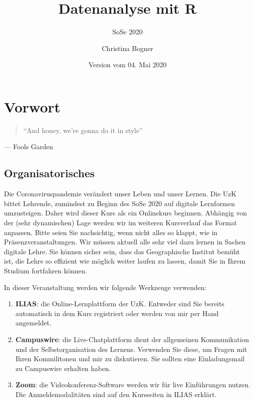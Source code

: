 \documentclass[]{book}
\title{Datenanalyse mit R}
\subtitle{SoSe 2020}
\author{Christina Bogner}
\date{Version vom 04. Mai 2020}
\providecommand{\tightlist}{%
  \setlength{\itemsep}{0pt}\setlength{\parskip}{0pt}}
\newenvironment{rmdinfo}{
  \definecolor{info}{rgb}{0.94, 0.97, 1.0}  %
  \color{black}
  \begin{mdframed}[backgroundcolor = info]}
 {\end{mdframed}}
\begin{document}
\maketitle

{
\setcounter{tocdepth}{1}
\tableofcontents
}
\hypertarget{vorwort}{%
\chapter{Vorwort}\label{vorwort}}

\begin{quote}
``And honey, we're gonna do it in style''
\end{quote}

\hfill --- Fools Garden

\hypertarget{organisatorisches}{%
\section{Organisatorisches}\label{organisatorisches}}

\begin{rmdinfo}
Die Coronaviruspandemie verändert unser Leben und unser Lernen. Die UzK
bittet Lehrende, zumindest zu Beginn des SoSe 2020 auf digitale
Lernformen umzusteigen. Daher wird dieser Kurs als ein Onlinekurs
beginnen. Abhängig von der (sehr dynamischen) Lage werden wir im
weiteren Kursverlauf das Format anpassen. Bitte seien Sie nachsichtig,
wenn nicht alles so klappt, wie in Präsenzveranstaltungen. Wir müssen
aktuell alle sehr viel dazu lernen in Sachen digitale Lehre. Sie können
sicher sein, dass das Geographische Institut bemüht ist, die Lehre so
effizient wie möglich weiter laufen zu lassen, damit Sie in Ihrem
Studium fortfahren können.
\end{rmdinfo}

In dieser Veranstaltung werden wir folgende Werkzeuge verwenden:

\begin{enumerate}
\def\labelenumi{\arabic{enumi}.}
\tightlist
\item
  \textbf{ILIAS}: die Online-Lernplattform der UzK. Entweder sind Sie bereits automatisch in dem Kurs registriert oder werden von mir per Hand angemeldet.
\item
  \textbf{Campuswire}: die Live-Chatplattform dient der allgemeinen Kommunikation und der Selbstorganisation des Lernens. Verwenden Sie diese, um Fragen mit Ihren Kommilitonen und mir zu diskutieren. Sie sollten eine Einladungsmail zu Campuswire erhalten haben.
\item
  \textbf{Zoom}: die Videokonferenz-Software werden wir für live Einführungen nutzen. Die Anmeldemodalitäten sind auf den Kursseiten in ILIAS erklärt.
\end{enumerate}
\end{document}
